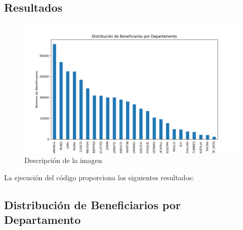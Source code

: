 \documentclass[12pt]{article}
\begin{document}
\subsection*{Resultados}

\begin{figure}[H]
	\centering
	\includegraphics[width=0.9\linewidth]{Figure_1.png}
	\caption{Descripción de la imagen}
	\label{fig:mi-imagen}
\end{figure}



La ejecución del código proporciona los siguientes resultados:

\subsection*{Distribución de Beneficiarios por Departamento}
\end{document}
